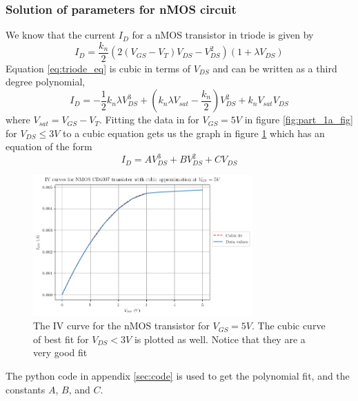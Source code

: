 \documentclass[titlepage, 12pt]{article}
\begin{document}
    \subsubsection{Solution of parameters for nMOS circuit}
    \label{sec:nmos_sol}
    We know that the current $I_D$ for a nMOS transistor in triode is
    given by
    \begin{equation}\label{eq:triode_eq}
        I_D = \frac{k_n}{2}\left(2(V_{GS} - V_T)V_{DS} - V_{DS}^2\right)
        (1 + \lambda V_{DS})
    \end{equation}
    Equation \eqref{eq:triode_eq} is cubic in terms of $V_{DS}$ and can
    be written as a third degree polynomial,
    \begin{equation}\label{eq:triode_poly}
        I_D = -\frac{1}{2}k_n\lambda V_{DS}^3
        + \left(k_n\lambda V_{sat} -\frac{k_n}{2}\right)V_{DS}^2
        + k_nV_{sat} V_{DS}
    \end{equation}
    where $V_{sat} = V_{GS} - V_T$. Fitting the data in for $V_{GS} =
    5V$ in figure \ref{fig:part_1a_fig} for $V_{DS} \leq 3V$ to a
    cubic equation gets us the graph in figure \ref{fig:part_1a_cube}
    which has an equation of the form
    \begin{equation}\label{eq:poly_fit}
        I_{D} = AV_{DS}^3 + BV_{DS}^2 + CV_{DS}
    \end{equation}
    \begin{figure}[H]
        \centering
        \includegraphics[width=0.75\textwidth]{figures/part_1_ncube.png}
        \caption{The IV curve for the nMOS transistor for $V_{GS} = 5V$.
            The cubic curve of best fit for $V_{DS} < 3V$ is plotted as
        well. Notice that they are a very good fit}
        \label{fig:part_1a_cube}
    \end{figure}
    The python code in appendix \ref{sec:code} is used to get the
    polynomial fit, and the constants $A$, $B$, and $C$.
\end{document}
